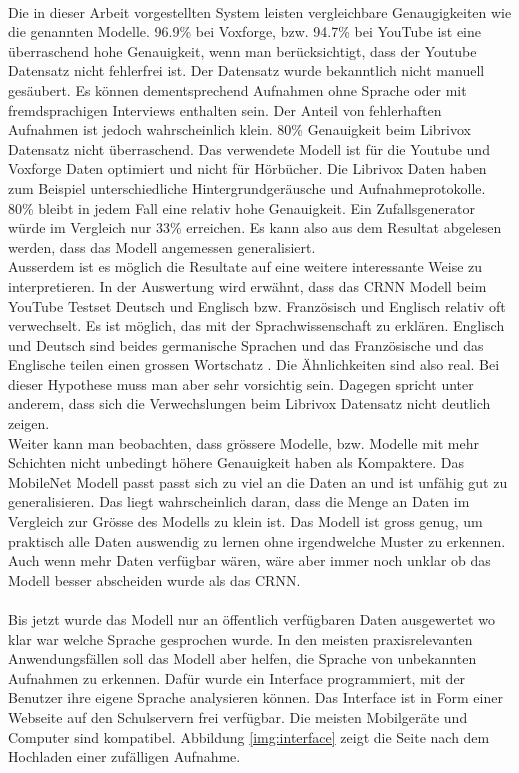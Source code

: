 \\
Die in dieser Arbeit vorgestellten System leisten vergleichbare Genaugigkeiten wie die genannten Modelle. 96.9\% bei Voxforge, bzw. 94.7\% bei YouTube ist eine überraschend hohe Genauigkeit, wenn man berücksichtigt, dass der Youtube Datensatz nicht fehlerfrei ist. Der Datensatz wurde bekanntlich nicht manuell gesäubert. Es können dementsprechend Aufnahmen ohne Sprache oder mit fremdsprachigen Interviews enthalten sein. Der Anteil von fehlerhaften Aufnahmen ist jedoch wahrscheinlich klein. 
80\% Genauigkeit beim Librivox Datensatz nicht überraschend. Das verwendete Modell ist für die Youtube und Voxforge Daten optimiert und nicht für Hörbücher. Die Librivox Daten haben zum Beispiel unterschiedliche Hintergrundgeräusche und Aufnahmeprotokolle. 80\% bleibt in jedem Fall eine relativ hohe Genauigkeit. Ein Zufallsgenerator würde im Vergleich nur 33\% erreichen. Es kann also aus dem Resultat abgelesen werden, dass das Modell angemessen generalisiert. 
\\
Ausserdem ist es möglich die Resultate auf eine weitere interessante Weise zu interpretieren. In der Auswertung wird erwähnt, dass das CRNN Modell beim YouTube Testset Deutsch und Englisch bzw. Französisch und Englisch relativ oft verwechselt. Es ist möglich, das mit der Sprachwissenschaft zu erklären. Englisch und Deutsch sind beides germanische Sprachen und das Französische und das Englische teilen einen grossen Wortschatz \parencite{germanic}\parencite{english}. Die Ähnlichkeiten sind also real. Bei dieser Hypothese muss man aber sehr vorsichtig sein. Dagegen spricht unter anderem, dass sich die Verwechslungen beim Librivox Datensatz nicht deutlich zeigen.
\\Weiter kann man beobachten, dass grössere Modelle, bzw. Modelle mit mehr Schichten nicht unbedingt höhere Genauigkeit haben als Kompaktere. Das MobileNet Modell passt passt sich zu viel an die Daten an und ist unfähig gut zu generalisieren. Das liegt wahrscheinlich daran, dass die Menge an Daten im Vergleich zur Grösse des Modells zu klein ist. Das Modell ist gross genug, um praktisch alle Daten auswendig zu lernen ohne irgendwelche Muster zu erkennen. Auch wenn mehr Daten verfügbar wären, wäre aber immer noch unklar ob das Modell besser abscheiden wurde als das CRNN.
\\ \\
Bis jetzt wurde das Modell nur an öffentlich verfügbaren Daten ausgewertet wo klar war welche Sprache gesprochen wurde. In den meisten praxisrelevanten Anwendungsfällen soll das Modell aber helfen, die Sprache von unbekannten Aufnahmen zu erkennen. Dafür wurde ein Interface programmiert, mit der Benutzer ihre eigene Sprache analysieren können. Das Interface ist in Form einer Webseite auf den Schulservern frei verfügbar. Die meisten Mobilgeräte und Computer sind kompatibel. Abbildung \ref{img:interface} zeigt die Seite nach dem Hochladen einer zufälligen Aufnahme.
